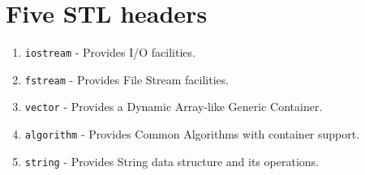 \documentclass{article}
\begin{document}
 \section*{Five STL headers}
 \begin{enumerate}
  \item \texttt{iostream} \-- Provides I/O facilities.
  \item \texttt{fstream} \-- Provides File Stream facilities.
  \item \texttt{vector} \-- Provides a Dynamic Array-like Generic Container.
  \item \texttt{algorithm} \-- Provides Common Algorithms with container support.
  \item \texttt{string} \-- Provides String data structure and its operations.
 \end{enumerate}
\end{document}

